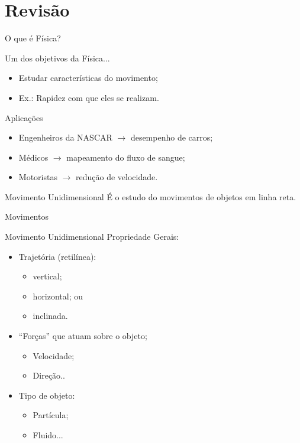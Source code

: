 \documentclass[xcolor=dvipsnames,table]{beamer}
\begin{document}
	\section{Revisão}
	\begin{frame}{O que é Física?}
		\begin{block}{Um dos objetivos da Física...}
			\begin{itemize}
				\item Estudar características do movimento; \pause
				\item Ex.: Rapidez com que eles se realizam.
			\end{itemize}
		\end{block} 
		\begin{block}{Aplicações}
			\begin{itemize}
				\item Engenheiros da NASCAR $\rightarrow$ desempenho de carros;
				\item Médicos $\rightarrow$ mapeamento do fluxo de sangue;
				\item Motoristas $\rightarrow$ redução de velocidade.
			\end{itemize}
		\end{block}
		\begin{block}{Movimento Unidimensional}
			É o estudo do movimentos de objetos em linha reta.
		\end{block}
	\end{frame}

	\begin{frame}{Movimentos}
		\begin{block}{Movimento Unidimensional}
			Propriedade Gerais:
			\begin{itemize}
				\item Trajetória (retilínea):
					\begin{itemize}
						\item vertical;
						\item horizontal; ou 
						\item inclinada.
					\end{itemize}
				\item ``Forças'' que atuam sobre o objeto;
					\begin{itemize}
						\item Velocidade;
						\item Direção..
					\end{itemize}
				\item Tipo de objeto:
					\begin{itemize}
						\item Partícula;
						\item Fluido...
					\end{itemize}
			\end{itemize}
		\end{block}
	\end{frame}
\end{document}
